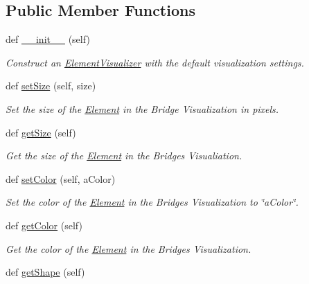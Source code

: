 \subsection*{Public Member Functions}
\begin{DoxyCompactItemize}
\item 
def \hyperlink{class_element_visualizer_1_1_element_visualizer_af8cdc78a3e01aeb46c3f0a6f18313267}{\+\_\+\+\_\+init\+\_\+\+\_\+} (self)
\begin{DoxyCompactList}\small\item\em Construct an \hyperlink{class_element_visualizer_1_1_element_visualizer}{Element\+Visualizer} with the default visualization settings. \end{DoxyCompactList}\item 
def \hyperlink{class_element_visualizer_1_1_element_visualizer_a62cc4d3f47385ae6d60b34b651456f29}{set\+Size} (self, size)
\begin{DoxyCompactList}\small\item\em Set the size of the \hyperlink{namespace_element}{Element} in the Bridge Visualization in pixels. \end{DoxyCompactList}\item 
def \hyperlink{class_element_visualizer_1_1_element_visualizer_a6021f693ae84d46c5e5d8fc27873ca7e}{get\+Size} (self)
\begin{DoxyCompactList}\small\item\em Get the size of the \hyperlink{namespace_element}{Element} in the Bridges Visualiation. \end{DoxyCompactList}\item 
def \hyperlink{class_element_visualizer_1_1_element_visualizer_a90429883a7814ab9571c1b5a0baa9e4e}{set\+Color} (self, a\+Color)
\begin{DoxyCompactList}\small\item\em Set the color of the \hyperlink{namespace_element}{Element} in the Bridges Visualization to \char`\"{}a\+Color\char`\"{}. \end{DoxyCompactList}\item 
def \hyperlink{class_element_visualizer_1_1_element_visualizer_a82a12847bbd1662462ef6493d240ee9d}{get\+Color} (self)
\begin{DoxyCompactList}\small\item\em Get the color of the \hyperlink{namespace_element}{Element} in the Bridges Visualization. \end{DoxyCompactList}\item 
def \hyperlink{class_element_visualizer_1_1_element_visualizer_a5a995818bc21ffba6bcab3c34220cf80}{get\+Shape} (self)

\end{DoxyCompactItemize}
